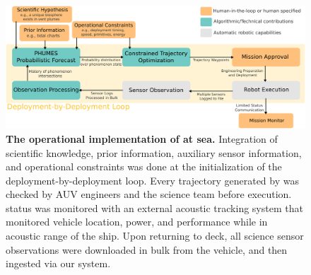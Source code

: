 \begin{figure}[h!]
    \centering
    \includegraphics[width=0.9\columnwidth]{figures/deployment_loop.png}
    \caption{\textbf{The operational implementation of \PHORTEX at sea.} Integration of scientific knowledge, prior information, auxiliary sensor information, and operational constraints was done at the initialization of the \PHORTEX deployment-by-deployment loop. Every trajectory generated by \PHORTEX was checked by AUV \Sentry engineers and the science team before execution. \Sentry status was monitored with an external acoustic tracking system that monitored vehicle location, power, and performance while in acoustic range of the ship. Upon returning to deck, all science sensor observations were downloaded in bulk from the vehicle, and then ingested via our \PHORTEX system.}
    \label{fig:at_sea_ops}
\end{figure}


